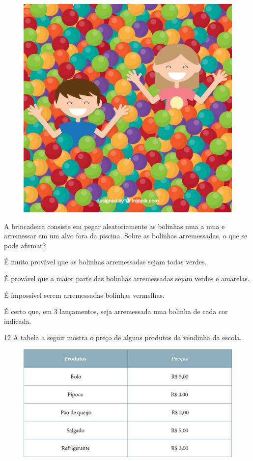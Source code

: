 \begin{figure}[H]
\centering
\includegraphics[width=.5\textwidth]{./media/image147.png}
\end{figure}

A brincadeira consiste em pegar aleatoriamente as bolinhas uma a uma e
arremessar em um alvo fora da piscina. Sobre as bolinhas arremessadas, o que se pode afirmar?

\begin{escolha}[itemsep=-5pt]
\item É muito provável que as bolinhas arremessadas sejam todas verdes.

\item É provável que a maior parte das bolinhas arremessadas sejam verdes e amarelas.

\item É impossível serem arremessadas bolinhas vermelhas.

\item É certo que, em 3 lançamentos, seja arremessada uma bolinha de cada cor indicada.
\end{escolha}

\num{12} A tabela a seguir mostra o preço de alguns produtos da vendinha da escola.

\begin{figure}[H]
\includegraphics[width=\textwidth]{./media/image148.png}
\end{figure}

